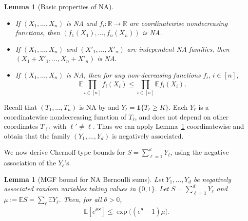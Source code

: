 \documentclass[aps,prx,reprint,superscriptaddress,amsmath,amssymb,longbibliography,floatfix]{revtex4-2}
\newcommand{\dsE}{\mathbb{E}}
\theoremstyle{plain}
\newtheorem{lemma}[theorem]{Lemma}
\theoremstyle{definition}
\theoremstyle{remark}
\begin{document}
\begin{lemma}[Basic properties of NA]\label{lem:NA-closure}

\begin{itemize}\quad
  \item If \((X_1,\dots,X_n)\) is NA and
    \(f_i:\mathbb R\to\mathbb R\) are coordinatewise nondecreasing
    functions, then \((f_1(X_1),\dots,f_n(X_n))\) is NA.
  \item If \((X_1,\dots,X_n)\) and \((X'_1,\dots,X'_n)\) are independent
    NA families, then \((X_1+X'_1,\dots,X_n+X'_n)\) is NA.
   \item If \((X_1,\dots,X_n)\) is
    NA, then for any non-decreasing functions $f_i,\,i\in[n]$, 
    \begin{equation}\dsE \prod_{i\in[n]} f_i(X_i) \leq \prod_{i\in[n]}\dsE  f_i(X_i). 
\label{eq:app-negative-association-product-bound}
\end{equation}
\end{itemize}

\end{lemma}


Recall that $(T_1,\dots,T_n)$ is NA by \cite{Dubhashi_Ranjan_Negative_Dependence96} and \(Y_\ell = \mathbf 1\{T_\ell \geq K\}\).
Each \(Y_\ell\) is a coordinatewise nondecreasing function of \(T_\ell\), and
does not depend on other coordinates \(T_{\ell'}\) with \(\ell'\neq \ell\).
Thus we can apply Lemma~\ref{lem:NA-closure} coordinatewise and obtain that the family $(Y_1,\dots,Y_d)$ is negatively associated.

We now derive Chernoff-type bounds for
$S = \sum_{\ell=1}^d Y_\ell$, using the
negative association of the $Y_\ell$'s.

\begin{lemma}[MGF bound for NA Bernoulli sums]\label{lem:mgf-NA}
Let $Y_1,\dots,Y_d$ be negatively associated random variables taking
values in $\{0,1\}$.
Let $S = \sum_{\ell=1}^d Y_\ell$ and $\mu := \dsE S = \sum_\ell \dsE Y_\ell$.
Then, for all $\theta > 0$,
\begin{align}
  \dsE [ e^{\theta S} ]
  \leq \exp\big( (e^{\theta}-1)\mu \big).
\label{eq:app-negative-association-mgf}
\end{align}
\end{lemma}
\end{document}
